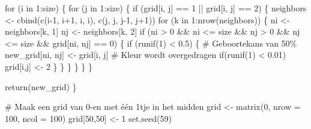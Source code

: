 \documentclass[
  a4paper,
]{scrbook}
\newenvironment{Shaded}{\begin{snugshade}}{\end{snugshade}}
\newcommand{\AttributeTok}[1]{\textcolor[rgb]{0.40,0.45,0.13}{#1}}
\newcommand{\CommentTok}[1]{\textcolor[rgb]{0.37,0.37,0.37}{#1}}
\newcommand{\ControlFlowTok}[1]{\textcolor[rgb]{0.00,0.23,0.31}{#1}}
\newcommand{\DecValTok}[1]{\textcolor[rgb]{0.68,0.00,0.00}{#1}}
\newcommand{\FloatTok}[1]{\textcolor[rgb]{0.68,0.00,0.00}{#1}}
\newcommand{\FunctionTok}[1]{\textcolor[rgb]{0.28,0.35,0.67}{#1}}
\newcommand{\NormalTok}[1]{\textcolor[rgb]{0.00,0.23,0.31}{#1}}
\newcommand{\OtherTok}[1]{\textcolor[rgb]{0.00,0.23,0.31}{#1}}
\newcommand{\SpecialCharTok}[1]{\textcolor[rgb]{0.37,0.37,0.37}{#1}}
\theoremstyle{definition}
\theoremstyle{remark}
\begin{document}
\begin{Shaded}
\begin{Highlighting}[]
  \ControlFlowTok{for}\NormalTok{ (i }\ControlFlowTok{in} \DecValTok{1}\SpecialCharTok{:}\NormalTok{size) \{}
    \ControlFlowTok{for}\NormalTok{ (j }\ControlFlowTok{in} \DecValTok{1}\SpecialCharTok{:}\NormalTok{size) \{}
      \ControlFlowTok{if}\NormalTok{ (grid[i, j] }\SpecialCharTok{==} \DecValTok{1} \SpecialCharTok{||}\NormalTok{ grid[i, j] }\SpecialCharTok{==} \DecValTok{2}\NormalTok{) \{}
\NormalTok{        neighbors }\OtherTok{\textless{}{-}} \FunctionTok{cbind}\NormalTok{(}\FunctionTok{c}\NormalTok{(i}\DecValTok{{-}1}\NormalTok{, i}\SpecialCharTok{+}\DecValTok{1}\NormalTok{, i, i), }\FunctionTok{c}\NormalTok{(j, j, j}\DecValTok{{-}1}\NormalTok{, j}\SpecialCharTok{+}\DecValTok{1}\NormalTok{))}
        \ControlFlowTok{for}\NormalTok{ (k }\ControlFlowTok{in} \DecValTok{1}\SpecialCharTok{:}\FunctionTok{nrow}\NormalTok{(neighbors)) \{}
\NormalTok{          ni }\OtherTok{\textless{}{-}}\NormalTok{ neighbors[k, }\DecValTok{1}\NormalTok{]}
\NormalTok{          nj }\OtherTok{\textless{}{-}}\NormalTok{ neighbors[k, }\DecValTok{2}\NormalTok{]}
          \ControlFlowTok{if}\NormalTok{ (ni }\SpecialCharTok{\textgreater{}} \DecValTok{0} \SpecialCharTok{\&\&}\NormalTok{ ni }\SpecialCharTok{\textless{}=}\NormalTok{ size }\SpecialCharTok{\&\&}\NormalTok{ nj }\SpecialCharTok{\textgreater{}} \DecValTok{0} \SpecialCharTok{\&\&}\NormalTok{ nj }\SpecialCharTok{\textless{}=}\NormalTok{ size }\SpecialCharTok{\&\&}\NormalTok{ grid[ni, nj] }\SpecialCharTok{==} \DecValTok{0}\NormalTok{) \{}
            \ControlFlowTok{if}\NormalTok{ (}\FunctionTok{runif}\NormalTok{(}\DecValTok{1}\NormalTok{) }\SpecialCharTok{\textless{}} \FloatTok{0.5}\NormalTok{) \{  }\CommentTok{\# Geboortekans van 50\%}
\NormalTok{              new\_grid[ni, nj] }\OtherTok{\textless{}{-}}\NormalTok{ grid[i, j]  }\CommentTok{\# Kleur wordt overgedragen}
              \ControlFlowTok{if}\NormalTok{(}\FunctionTok{runif}\NormalTok{(}\DecValTok{1}\NormalTok{) }\SpecialCharTok{\textless{}} \FloatTok{0.01}\NormalTok{) grid[i,j] }\OtherTok{\textless{}{-}} \DecValTok{2}
\NormalTok{            \}}
\NormalTok{          \}}
\NormalTok{        \}}
\NormalTok{      \}}
\NormalTok{    \}}
\NormalTok{  \}}
  
  \FunctionTok{return}\NormalTok{(new\_grid)}
\NormalTok{\}}

\CommentTok{\# Maak een grid van 0{-}en met één 1tje in het midden}
\NormalTok{grid }\OtherTok{\textless{}{-}} \FunctionTok{matrix}\NormalTok{(}\DecValTok{0}\NormalTok{, }\AttributeTok{nrow =} \DecValTok{100}\NormalTok{, }\AttributeTok{ncol =} \DecValTok{100}\NormalTok{)}
\NormalTok{grid[}\DecValTok{50}\NormalTok{,}\DecValTok{50}\NormalTok{] }\OtherTok{\textless{}{-}} \DecValTok{1}
\FunctionTok{set.seed}\NormalTok{(}\DecValTok{59}\NormalTok{)}


\end{Highlighting}
\end{Shaded}
\end{document}
